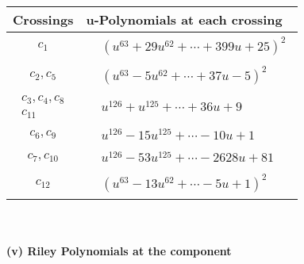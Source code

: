 \documentclass[1p]{elsarticle_modified}
\theoremstyle{definition}
\begin{document}
\begin{tabular}{m{50pt}|m{274pt}}
Crossings & \hspace{64pt}u-Polynomials at each crossing \\
\hline $$\begin{aligned}c_{1}\end{aligned}$$&$\begin{aligned}
&(u^{63}+29 u^{62}+\cdots+399 u+25)^{2}
\end{aligned}$\\
\hline $$\begin{aligned}c_{2},c_{5}\end{aligned}$$&$\begin{aligned}
&(u^{63}-5 u^{62}+\cdots+37 u-5)^{2}
\end{aligned}$\\
\hline $$\begin{aligned}c_{3},c_{4},c_{8}\\c_{11}\end{aligned}$$&$\begin{aligned}
&u^{126}+u^{125}+\cdots+36 u+9
\end{aligned}$\\
\hline $$\begin{aligned}c_{6},c_{9}\end{aligned}$$&$\begin{aligned}
&u^{126}-15 u^{125}+\cdots-10 u+1
\end{aligned}$\\
\hline $$\begin{aligned}c_{7},c_{10}\end{aligned}$$&$\begin{aligned}
&u^{126}-53 u^{125}+\cdots-2628 u+81
\end{aligned}$\\
\hline $$\begin{aligned}c_{12}\end{aligned}$$&$\begin{aligned}
&(u^{63}-13 u^{62}+\cdots-5 u+1)^{2}
\end{aligned}$\\
\hline
\end{tabular}\\~\\
\newpage\renewcommand{\arraystretch}{1}
\flushleft \textbf{(v) Riley Polynomials at the component}\newline \\
\end{document}
